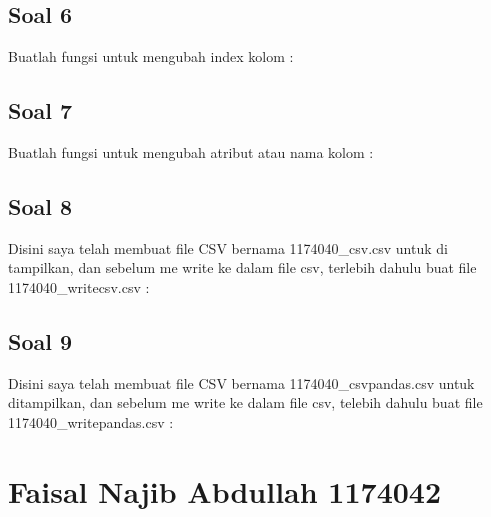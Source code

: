 \subsection{Soal 6}
Buatlah fungsi  untuk mengubah index kolom : 


\subsection{Soal 7}
Buatlah fungsi  untuk mengubah atribut atau nama kolom : 


\subsection{Soal 8}
Disini saya telah membuat file CSV bernama 1174040\_csv.csv untuk di tampilkan, dan sebelum me write ke dalam file csv, terlebih dahulu buat file 1174040\_writecsv.csv : 


\subsection{Soal 9}
Disini saya telah membuat file CSV bernama 1174040\_csvpandas.csv untuk ditampilkan, dan sebelum me write ke dalam file csv, telebih dahulu buat file 1174040\_writepandas.csv : 


\section{Faisal Najib Abdullah 1174042}
